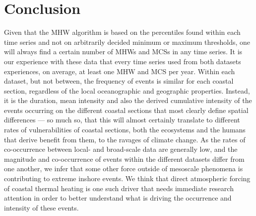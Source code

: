 \documentclass[a4paper,10pt,review]{elsarticle}
\begin{document}
\section{Conclusion}
Given that the MHW algorithm is based on the percentiles found within each time series and not on arbitrarily decided minimum or maximum thresholds, one will always find a certain number of MHWs and MCSs in any time series. It is our experience with these data that every time series used from both datasets experiences, on average, at least one MHW and MCS per year. Within each dataset, but not between, the frequency of events is similar for each coastal section, regardless of the local oceanographic and geographic properties. Instead, it is the duration, mean intensity and also the derived cumulative intensity of the events occurring on the different coastal sections that most clearly define spatial differences --- so much so, that this will almost certainly translate to different rates of vulnerabilities of coastal sections, both the ecosystems and the humans that derive benefit from them, to the ravages of climate change. As the rates of co-occurrence between local- and broad-scale data are generally low, and the magnitude and co-occurrence of events within the different datasets differ from one another, we infer that some other force outside of mesoscale phenomena is contributing to extreme inshore events. We think that direct atmospheric forcing of coastal thermal heating is one such driver that needs immediate research attention in order to better understand what is driving the occurrence and intensity of these events.
\end{document}
